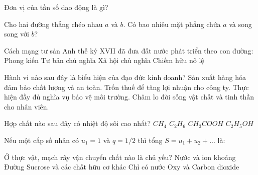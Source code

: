 \begin{ex}
    Đơn vị của tần số dao động là gì?
\end{ex}

\begin{ex}
    Cho hai đường thẳng chéo nhau $a$ và $b$. Có bao nhiêu mặt phẳng chứa $a$ và song song với $b$?
\end{ex}

\begin{ex}
    Cách mạng tư sản Anh thế kỷ XVII đã đưa đất nước phát triển theo con đường:
    \choice
    {Phong kiến}
    {\True Tư bản chủ nghĩa}
    {Xã hội chủ nghĩa}
    {Chiếm hữu nô lệ}
\end{ex}

\begin{ex}
    Hành vi nào sau đây là biểu hiện của đạo đức kinh doanh?
    \choiceTF
    {\True Sản xuất hàng hóa đảm bảo chất lượng và an toàn.}
    {Trốn thuế để tăng lợi nhuận cho công ty.}
    {\True Thực hiện đầy đủ nghĩa vụ bảo vệ môi trường.}
    {\True Chăm lo đời sống vật chất và tinh thần cho nhân viên.}
\end{ex}

\begin{ex}
    Hợp chất nào sau đây có nhiệt độ sôi cao nhất?
    \choice
    {$CH_4$}
    {$C_2H_6$}
    {\True $CH_3COOH$}
    {$C_2H_5OH$}
\end{ex}

\begin{ex}
    Nếu một cấp số nhân có $u_1=1$ và $q=1/2$ thì tổng $S = u_1 + u_2 + ...$ là:
\end{ex}

\begin{ex}
    Ở thực vật, mạch rây vận chuyển chất nào là chủ yếu?
    \choice
    {Nước và ion khoáng}
    {\True Đường Sucrose và các chất hữu cơ khác}
    {Chỉ có nước}
    {Oxy và Carbon dioxide}
\end{ex}

